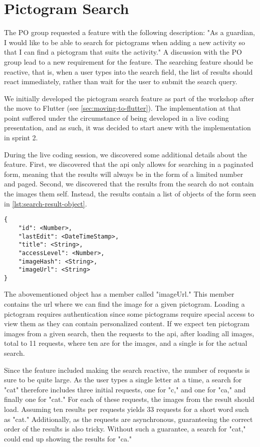 \section{Pictogram Search}
The \gls{PO} group requested a feature with the following description: "As a guardian, I would like to be able to search for pictograms when adding a new activity so that I can find a pictogram that suits the activity." A discussion with the \gls{PO} group lead to a new requirement for the feature. The searching feature should be reactive, that is, when a user types into the search field, the list of results should react immediately, rather than wait for the user to submit the search query.

We initially developed the pictogram search feature as part of the workshop after the move to Flutter (see \autoref{sec:moving-to-flutter}). The implementation at that point suffered under the circumstance of being developed in a live coding presentation, and as such, it was decided to start anew with the implementation in sprint 2.

During the live coding session, we discovered some additional details about the feature. First, we discovered that the \gls{api} only allows for searching in a paginated form, meaning that the results will always be in the form of a limited number and paged. Second, we discovered that the results from the search do not contain the images them self. Instead, the results contain a list of objects of the form seen in \autoref{lst:search-result-object}.

\begin{lstlisting}[label={lst:search-result-object},caption={Search result object}]
{
    "id": <Number>,
    "lastEdit": <DateTimeStamp>,
    "title": <String>,
    "accessLevel": <Number>,
    "imageHash": <String>,
    "imageUrl": <String>
}
\end{lstlisting}

The abovementioned object has a member called "imageUrl." This member contains the \gls{url} where we can find the image for a given pictogram. Loading a pictogram requires authentication since some pictograms require special access to view them as they can contain personalized content. If we expect ten pictogram images from a given search, then the requests to the \gls{api}, after loading all images, total to 11 requests, where ten are for the images, and a single is for the actual search.

Since the feature included making the search reactive, the number of requests is sure to be quite large. As the user types a single letter at a time, a search for "cat" therefore includes three initial requests, one for "c," and one for "ca," and finally one for "cat." For each of these requests, the images from the result should load. Assuming ten results per requests yields 33 requests for a short word such as "cat." Additionally, as the requests are asynchronous, guaranteeing the correct order of the results is also tricky. Without such a guarantee, a search for "cat," could end up showing the results for "ca."

